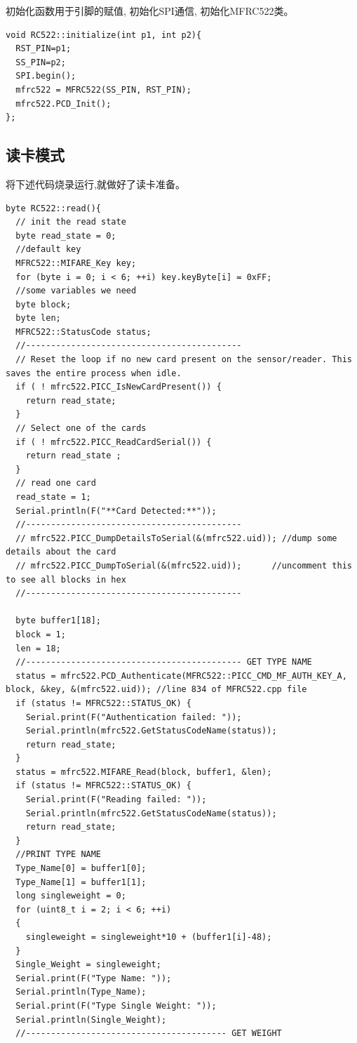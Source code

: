 \documentclass{article}
\begin{document}
初始化函数用于引脚的赋值, 初始化SPI通信, 初始化MFRC522类。
\begin{lstlisting}
void RC522::initialize(int p1, int p2){
  RST_PIN=p1;
  SS_PIN=p2;
  SPI.begin();
  mfrc522 = MFRC522(SS_PIN, RST_PIN);                                           
  mfrc522.PCD_Init();  
};	
\end{lstlisting}


\subsection{读卡模式}
将下述代码烧录运行,就做好了读卡准备。
\begin{lstlisting}
byte RC522::read(){
  // init the read state
  byte read_state = 0;
  //default key 
  MFRC522::MIFARE_Key key;
  for (byte i = 0; i < 6; ++i) key.keyByte[i] = 0xFF;
  //some variables we need
  byte block;
  byte len;
  MFRC522::StatusCode status;
  //-------------------------------------------
  // Reset the loop if no new card present on the sensor/reader. This saves the entire process when idle.
  if ( ! mfrc522.PICC_IsNewCardPresent()) {
    return read_state;
  }
  // Select one of the cards
  if ( ! mfrc522.PICC_ReadCardSerial()) {
    return read_state ;
  }
  // read one card
  read_state = 1;
  Serial.println(F("**Card Detected:**"));
  //-------------------------------------------
  // mfrc522.PICC_DumpDetailsToSerial(&(mfrc522.uid)); //dump some details about the card
  // mfrc522.PICC_DumpToSerial(&(mfrc522.uid));      //uncomment this to see all blocks in hex
  //-------------------------------------------

  byte buffer1[18];
  block = 1;
  len = 18;
  //------------------------------------------- GET TYPE NAME
  status = mfrc522.PCD_Authenticate(MFRC522::PICC_CMD_MF_AUTH_KEY_A, block, &key, &(mfrc522.uid)); //line 834 of MFRC522.cpp file
  if (status != MFRC522::STATUS_OK) {
    Serial.print(F("Authentication failed: "));
    Serial.println(mfrc522.GetStatusCodeName(status));
    return read_state;
  }
  status = mfrc522.MIFARE_Read(block, buffer1, &len);
  if (status != MFRC522::STATUS_OK) {
    Serial.print(F("Reading failed: "));
    Serial.println(mfrc522.GetStatusCodeName(status));
    return read_state;
  }
  //PRINT TYPE NAME
  Type_Name[0] = buffer1[0];
  Type_Name[1] = buffer1[1];
  long singleweight = 0;
  for (uint8_t i = 2; i < 6; ++i)
  {
    singleweight = singleweight*10 + (buffer1[i]-48);
  }
  Single_Weight = singleweight;
  Serial.print(F("Type Name: "));
  Serial.println(Type_Name);
  Serial.print(F("Type Single Weight: "));
  Serial.println(Single_Weight);
  //---------------------------------------- GET WEIGHT


\end{lstlisting}
\end{document}
